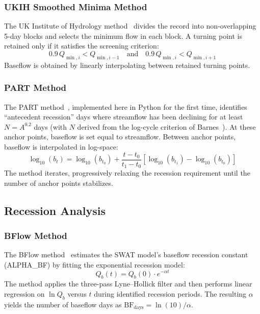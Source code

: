 \documentclass[hydrology,article,submit,pdftex,moreauthors]{Definitions/mdpi}
\begin{document}
\subsubsection{UKIH Smoothed Minima Method}

The UK Institute of Hydrology method~\cite{UKIH1980} divides the record into non-overlapping 5-day blocks and selects the minimum flow in each block. A turning point is retained only if it satisfies the screening criterion:
\begin{equation}
\label{eq:ukih}
0.9 \, Q_{\min,i} < Q_{\min,i-1} \quad \text{and} \quad 0.9 \, Q_{\min,i} < Q_{\min,i+1}
\end{equation}
Baseflow is obtained by linearly interpolating between retained turning points.

\subsubsection{PART Method}

The PART method~\cite{Rutledge1998}, implemented here in Python for the first time, identifies ``antecedent recession'' days where streamflow has been declining for at least $N = A^{0.2}$ days (with $N$ derived from the log-cycle criterion of Barnes~\cite{Barnes1939}). At these anchor points, baseflow is set equal to streamflow. Between anchor points, baseflow is interpolated in log-space:
\begin{equation}
\label{eq:part}
\log_{10}(b_t) = \log_{10}(b_{t_0}) + \frac{t - t_0}{t_1 - t_0} \left[ \log_{10}(b_{t_1}) - \log_{10}(b_{t_0}) \right]
\end{equation}
The method iterates, progressively relaxing the recession requirement until the number of anchor points stabilizes.

\subsection{Recession Analysis}
\label{sec:recession}

\subsubsection{BFlow Method}

The BFlow method~\cite{Arnold1999} estimates the SWAT model's baseflow recession constant (ALPHA\_BF) by fitting the exponential recession model:
\begin{equation}
\label{eq:bflow}
Q_b(t) = Q_b(0) \cdot e^{-\alpha t}
\end{equation}
The method applies the three-pass Lyne--Hollick filter and then performs linear regression on $\ln Q_b$ versus $t$ during identified recession periods. The resulting $\alpha$ yields the number of baseflow days as $\mathrm{BF_{days}} = \ln(10)/\alpha$.
\end{document}
